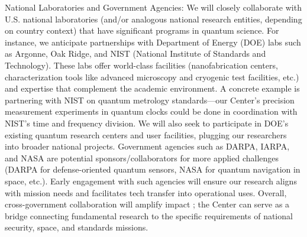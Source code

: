 \documentclass[12pt]{article}
\begin{document}
National Laboratories and Government Agencies: We will closely collaborate with U.S. national laboratories (and/or analogous national research entities, depending on country context) that have significant programs in quantum science. For instance, we anticipate partnerships with Department of Energy (DOE) labs such as Argonne, Oak Ridge, and NIST (National Institute of Standards and Technology). These labs offer world-class facilities (nanofabrication centers, characterization tools like advanced microscopy and cryogenic test facilities, etc.) and expertise that complement the academic environment. A concrete example is partnering with NIST on quantum metrology standards—our Center’s precision measurement experiments in quantum clocks could be done in coordination with NIST’s time and frequency division. We will also seek to participate in DOE’s existing quantum research centers and user facilities, plugging our researchers into broader national projects. Government agencies such as DARPA, IARPA, and NASA are potential sponsors/collaborators for more applied challenges (DARPA for defense-oriented quantum sensors, NASA for quantum navigation in space, etc.). Early engagement with such agencies will ensure our research aligns with mission needs and facilitates tech transfer into operational uses. Overall, cross-government collaboration will amplify impact ; the Center can serve as a bridge connecting fundamental research to the specific requirements of national security, space, and standards missions.
\end{document}
